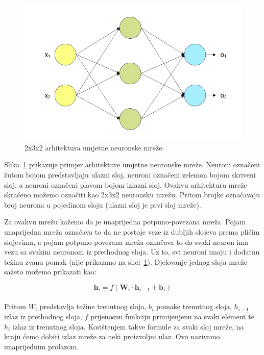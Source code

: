 \documentclass[times, utf8, zavrsni, numeric]{fer}
\begin{document}
\pagebreak
\begin{figure}[htb]
    \centering
    \includegraphics{basic_nn_labeled.png}
    \caption{2x3x2 arhitektura umjetne neuronske mreže.}
    \label{fig:basic_nn}
\end{figure}

Slika~\ref{fig:basic_nn} prikazuje primjer arhitekture umjetne neuronske mreže. 
Neuroni označeni žutom bojom predstavljaju ulazni sloj, neuroni označeni zelenom bojom skriveni sloj, a neuroni označeni plavom bojom izlazni sloj. 
Ovakvu arhitekturu mreže skraćeno možemo označiti kao 2x3x2 neuronsku mrežu. Pritom brojke označavaju broj neurona u pojedinom sloju (ulazni sloj je prvi sloj mreže).

Za ovakvu mrežu kažemo da je unaprijedna potpuno-povezana mreža. 
Pojam unaprijedna mreža označava to da ne postoje veze iz dubljih slojeva prema plićim slojevima, a pojam potpuno-povezana mreža označava to da svaki neuron ima vezu sa svakim neuronom iz prethodnog sloja.
Uz to, svi neuroni imaju i dodatnu težinu zvanu pomak (nije prikazano na slici~\ref{fig:basic_nn}). Djelovanje jednog sloja mreže sažeto možemo prikazati kao:

\begin{equation}
    \pmb{h}_{i} = f(\pmb{W}_{i} \cdot \pmb{h}_{i-1} + \pmb{b}_{i})
    \label{eq:nn_layer}
\end{equation}
\\
Pritom $W_{i}$ predstavlja težine trenutnog sloja, $b_{i}$ pomake trenutnog sloja, $h_{i-1}$ izlaz iz prethodnog sloja, $f$ prijenosnu funkciju primijenjenu na svaki element te $h_{i}$ izlaz iz trenutnog sloja.
Korištenjem takve formule za svaki sloj mreže, na kraju ćemo dobiti izlaz mreže za neki proizvoljni ulaz. Ovo nazivamo unaprijednim prolazom.
\end{document}
